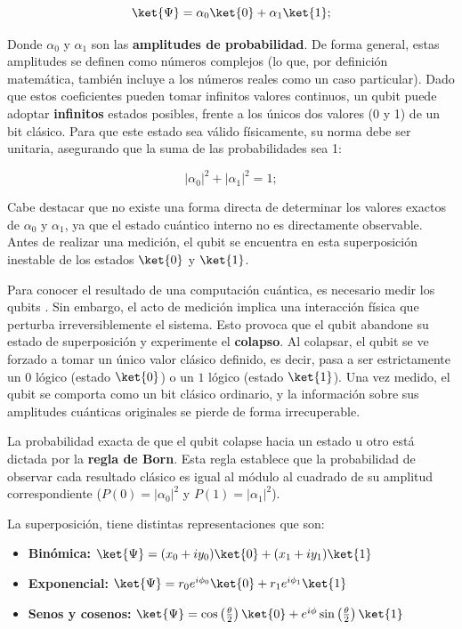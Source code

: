 \[
    \ket{\Psi} = \alpha_0\ket{0} + \alpha_1\ket{1};
\]

Donde $\alpha_0$ y $\alpha_1$ son las \textbf{amplitudes de probabilidad}. De forma general, estas amplitudes se definen como números complejos (lo que, por definición matemática, también incluye a los números reales como un caso particular). Dado que estos coeficientes pueden tomar infinitos valores continuos, un qubit puede adoptar \textbf{infinitos} estados posibles, frente a los únicos dos valores (0 y 1) de un bit clásico. Para que este estado sea válido físicamente, su norma debe ser unitaria, asegurando que la suma de las probabilidades sea 1:

\[
    |\alpha_0|^2 + |\alpha_1|^2 = 1;
\]

Cabe destacar que no existe una forma directa de determinar los valores exactos de $\alpha_0$ y $\alpha_1$, ya que el estado cuántico interno no es directamente observable. Antes de realizar una medición, el qubit se encuentra en esta superposición inestable de los estados $\ket{0}$ y $\ket{1}$.

Para conocer el resultado de una computación cuántica, es necesario medir los qubits \cite{sholtis_measure_qubits_2019}. Sin embargo, el acto de medición implica una interacción física que perturba irreversiblemente el sistema. Esto provoca que el qubit abandone su estado de superposición y experimente el \textbf{colapso}. Al colapsar, el qubit se ve forzado a tomar un único valor clásico definido, es decir, pasa a ser estrictamente un $0$ lógico (estado $\ket{0}$) o un $1$ lógico (estado $\ket{1}$). Una vez medido, el qubit se comporta como un bit clásico ordinario, y la información sobre sus amplitudes cuánticas originales se pierde de forma irrecuperable.

La probabilidad exacta de que el qubit colapse hacia un estado u otro está dictada por la \textbf{regla de Born}. Esta regla establece que la probabilidad de observar cada resultado clásico es igual al módulo al cuadrado de su amplitud correspondiente ($P(0) = |\alpha_0|^2$ y $P(1) = |\alpha_1|^2$).

La superposición, tiene distintas representaciones que son:

\begin{itemize}
    \item \textbf{Binómica:} $\ket{\Psi} = (x_0 + i y_0) \ket{0} + (x_1 + i y_1) \ket{1}$
    \item \textbf{Exponencial:} $\ket{\Psi} = r_0 e^{i\phi_0} \ket{0} + r_1 e^{i\phi_1} \ket{1}$
    \item \textbf{Senos y cosenos:} $\ket{\Psi} = \cos\left(\frac{\theta}{2}\right) \ket{0} + e^{i\phi} \sin\left(\frac{\theta}{2}\right) \ket{1}$
\end{itemize}

